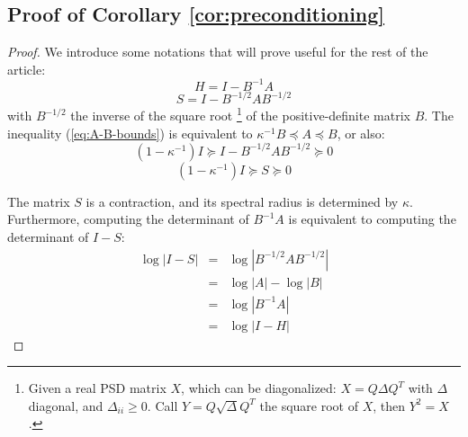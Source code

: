 \subsection{Proof of Corollary \ref{cor:preconditioning}}
\begin{proof}
We introduce some notations that will prove useful for the rest of
the article: 
\[
H=I-B^{-1}A
\]
\[
S=I-B^{-1/2}AB^{-1/2}
\]
with $B^{-1/2}$ the inverse of the square root%
\footnote{Given a real PSD matrix $X$, which can be diagonalized: $X=Q\Delta Q^{T}$
with $\Delta$ diagonal, and $\Delta_{ii}\geq0$. Call $Y=Q\sqrt{\Delta}Q^{T}$
the square root of $X$, then $Y^{2}=X$.%
} of the positive-definite matrix $B$. The inequality (\ref{eq:A-B-bounds})
is equivalent to $\kappa^{-1}B\preceq A\preceq B$, or also: 
\[
\left(1-\kappa^{-1}\right)I\succeq I-B^{-1/2}AB^{-1/2}\succeq0
\]
\begin{equation}
\left(1-\kappa^{-1}\right)I\succeq S\succeq0\label{eq:s-encadrement}
\end{equation}


The matrix $S$ is a contraction, and its spectral radius is determined
by $\kappa$. Furthermore, computing the determinant of $B^{-1}A$
is equivalent to computing the determinant of $I-S$: 
\begin{eqnarray*}
\log\left|I-S\right| & = & \log\left|B^{-1/2}AB^{-1/2}\right|\\
 & = & \log\left|A\right|-\log\left|B\right|\\
 & = & \log\left|B^{-1}A\right|\\
 & = & \log\left|I-H\right|
\end{eqnarray*}



\end{proof}
